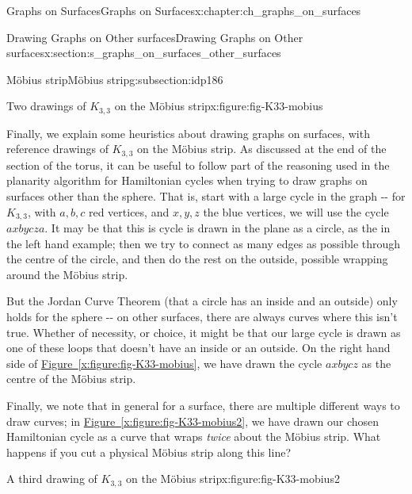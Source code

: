 \documentclass[oneside,10pt,]{book}
\newcommand{\xreffont}{\relax}
\numberwithin{equation}{section}
\begin{document}
\begin{chapterptx}{Graphs on Surfaces}{}{Graphs on Surfaces}{}{}{x:chapter:ch_graphs_on_surfaces}
\begin{sectionptx}{Drawing Graphs on Other surfaces}{}{Drawing Graphs on Other surfaces}{}{}{x:section:s_graphs_on_surfaces_other_surfaces}
\begin{subsectionptx}{Möbius strip}{}{Möbius strip}{}{}{g:subsection:idp186}
\begin{figureptx}{Two drawings of \(K_{3,3}\) on the Möbius strip}{x:figure:fig-K33-mobius}{}
\begin{image}{0}{1}{0}
{
}%
\end{image}%
\tcblower
\end{figureptx}%
Finally, we explain some heuristics about drawing graphs on surfaces, with reference drawings of \(K_{3,3}\) on the Möbius strip.  As discussed at the end of the section of the torus, it can be useful to follow part of the reasoning used in the planarity algorithm for Hamiltonian cycles when trying to draw graphs on surfaces other than the sphere.  That is, start with a large cycle in the graph -{}-{} for \(K_{3,3}\), with \(a,b,c\) red vertices, and \(x,y,z\) the blue vertices, we will use the cycle \(axbycza\).  It may be that this is cycle is drawn in the plane as a circle, as the in the left hand example; then we try to connect as many edges as possible through the centre of the circle, and then do the rest on the outside, possible wrapping around the Möbius strip.%
\par
But the Jordan Curve Theorem (that a circle has an inside and an outside) only holds for the sphere -{}-{} on other surfaces, there are always curves where this isn't true.  Whether of necessity, or choice, it might be that our large cycle is drawn as one of these loops that doesn't have an inside or an outside.  On the right hand side of \hyperref[x:figure:fig-K33-mobius]{Figure~{\xreffont\ref{x:figure:fig-K33-mobius}}}, we have drawn the cycle \(axbycz\) as the centre of the Möbius strip.%
\par
Finally, we note that in general for a surface, there are multiple different ways to draw curves; in \hyperref[x:figure:fig-K33-mobius2]{Figure~{\xreffont\ref{x:figure:fig-K33-mobius2}}}, we have drawn our chosen Hamiltonian cycle as a curve that wraps \emph{twice} about the Möbius strip.  What happens if you cut a physical Möbius strip along this line?%
\begin{figureptx}{A third drawing of \(K_{3,3}\) on the Möbius strip}{x:figure:fig-K33-mobius2}{}%
\begin{image}{0}{1}{0}%
\end{image}
\end{figureptx}
\end{subsectionptx}
\end{sectionptx}
\end{chapterptx}
\end{document}

